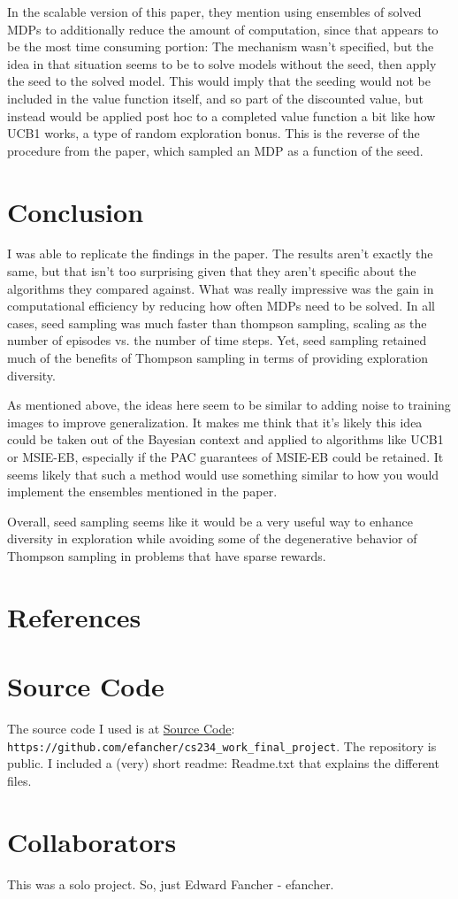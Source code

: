 \documentclass{article}
\begin{document}
In the scalable version of this paper,  they mention using ensembles of solved MDPs to additionally reduce the amount of computation, since that appears to be the most time consuming portion:  \cite{SCALSS} The mechanism wasn't specified, but the idea in that situation seems to be to solve models without the seed, then apply the seed to the solved model. This would imply that the seeding would not be included in the value function itself, and so part of the discounted value, but instead would be applied post hoc to a completed value function a bit like how UCB1 works, a type of random exploration bonus.  This is the reverse of the procedure from the \citep{SeedSampling} paper, which sampled an MDP as a function of the seed.  

\section{Conclusion}
I was able to replicate the findings in the paper. The results aren't exactly the same, but that isn't too surprising given that they aren't specific about the algorithms they compared against. What was really impressive was the gain in computational efficiency by reducing how often MDPs need to be solved. In all cases, seed sampling was much faster than thompson sampling, scaling as the number of episodes vs. the number of time steps. Yet, seed sampling retained much of the benefits of Thompson sampling in terms of providing exploration diversity.


As mentioned above, the ideas here seem to be similar to adding noise to training images to improve generalization. It makes me think that it's likely this idea could be taken out of the Bayesian context and applied to algorithms like UCB1 or MSIE-EB, especially if the PAC guarantees of MSIE-EB could be retained. It seems likely that such a method would use something similar to how you would implement the ensembles mentioned in the \cite{SCALSS} paper.

Overall, seed sampling seems like it would be a very useful way to enhance diversity in exploration while avoiding some of the degenerative behavior of Thompson sampling in problems that have sparse rewards.
\section{References}




\section{Source Code}
The source code I used is at \href{https://github.com/efancher/cs234_work_final_project}{Source Code}: \verb|https://github.com/efancher/cs234_work_final_project|. The repository is public. I included a (very) short readme: Readme.txt that explains the different files.

\section{Collaborators}
This was a solo project. So, just Edward Fancher - efancher.
\end{document}
